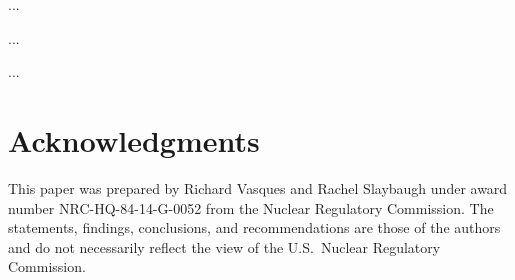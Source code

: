 \documentclass[12pt]{article}
\begin{document}
...

...

...




\section*{Acknowledgments}

This paper was prepared by Richard Vasques and Rachel Slaybaugh under award number NRC-HQ-84-14-G-0052 from the Nuclear Regulatory Commission.
The statements, findings, conclusions, and recommendations are those of the authors and do not necessarily reflect the view of the U.S.\ Nuclear Regulatory Commission.

\setlength{\baselineskip}{12pt}
\end{document}
